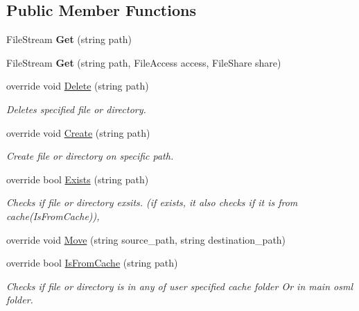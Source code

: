 \subsection*{Public Member Functions}
\begin{DoxyCompactItemize}
\item 
\mbox{\label{classOSML_1_1IO_1_1OSMLStorage_1_1CFile_a29b798a2a52b5676644fb139a02c6fe2}} 
File\+Stream {\bfseries Get} (string path)
\item 
\mbox{\label{classOSML_1_1IO_1_1OSMLStorage_1_1CFile_af40641282c9fb62efe9cd2c6653e29b0}} 
File\+Stream {\bfseries Get} (string path, File\+Access access, File\+Share share)
\item 
override void \mbox{\hyperlink{classOSML_1_1IO_1_1OSMLStorage_1_1CFile_a23dcf0c1471b9eb59e43b46ce7e6fa48}{Delete}} (string path)
\begin{DoxyCompactList}\small\item\em Deletes specified file or directory. \end{DoxyCompactList}\item 
override void \mbox{\hyperlink{classOSML_1_1IO_1_1OSMLStorage_1_1CFile_a1854c3a8403c27dda2bce815c0000697}{Create}} (string path)
\begin{DoxyCompactList}\small\item\em Create file or directory on specific path. \end{DoxyCompactList}\item 
override bool \mbox{\hyperlink{classOSML_1_1IO_1_1OSMLStorage_1_1CFile_ab74c1d57146a48a39bffe7ba6853752c}{Exists}} (string path)
\begin{DoxyCompactList}\small\item\em Checks if file or directory exsits. (if exists, it also checks if it is from cache(\+Is\+From\+Cache)), \end{DoxyCompactList}\item 
override void \mbox{\hyperlink{classOSML_1_1IO_1_1OSMLStorage_1_1CFile_a94ec4b71a537df1234a5ca44ae7bd825}{Move}} (string source\+\_\+path, string destination\+\_\+path)
\item 
override bool \mbox{\hyperlink{classOSML_1_1IO_1_1OSMLStorage_1_1CFile_ac3c40ae47a8251eaafa0796b67d144c6}{Is\+From\+Cache}} (string path)
\begin{DoxyCompactList}\small\item\em Checks if file or directory is in any of user specified cache folder Or in main osml folder. \end{DoxyCompactList}\end{DoxyCompactItemize}


